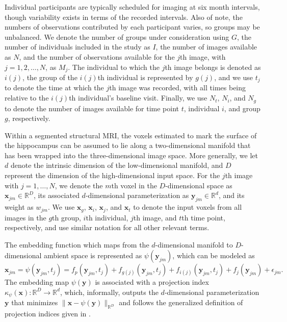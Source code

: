 \documentclass[11pt,reqno]{article}
\theoremstyle{definition}
\begin{document}
Individual participants are typically scheduled for imaging at six month intervals, though variability exists in terms of the recorded intervals. Also of note, the numbers of observations contributed by each participant varies, so groups may be unbalanced. We denote the number of groups under consideration using $G$, the number of individuals included in the study as $I$, the number of images available as $N$, and the number of observations available for the $j$th image, with $j = 1, 2, \dots, N$, as $M_j$. The individual to which the $j$th image belongs is denoted as $i(j)$, the group of the $i(j)$th individual is represented by $g(j)$, and we use $t_j$ to denote the time at which the $j$th image was recorded, with all times being relative to the $i(j)$th individual's baseline visit. Finally, we use $N_t$, $N_i$, and $N_g$ to denote the number of images available for time point $t$, individual $i$, and group $g$, respectively.

Within a segmented structural MRI, the voxels estimated to mark the surface of the hippocampus can be assumed to lie along a two-dimensional manifold that has been wrapped into the three-dimensional image space. More generally, we let $d$ denote the intrinsic dimension of the low-dimensional manifold, and $D$ represent the dimension of the high-dimensional input space. For the $j$th image with $j = 1, \dots, N$, we denote the $m$th voxel in the $D$-dimensional space as $\mathbf{x}_{jm} \in \mathbb{R}^{D}$, its associated $d$-dimensional parameterization as $\mathbf{y}_{jm} \in \mathbb{R}^{d}$, and its weight as $w_{jm}$. We use $\mathbf{x}_g$, $\mathbf{x}_i$, $\mathbf{x}_{j}$, and $\mathbf{x}_t$ to denote the input voxels from all images in the $g$th group, $i$th individual, $j$th image, and $t$th time point, respectively, and use similar notation for all other relevant terms.

The embedding function which maps from the $d$-dimensional manifold to $D$-dimensional ambient space is represented as $\psi(\mathbf{y}_{jm})$, which can be modeled as 
\begin{equation}
  \mathbf{x}_{jm} = \psi(\mathbf{y}_{jm}, t_j) = f_p(\mathbf{y}_{jm}, t_{j}) + f_{g(j)}(\mathbf{y}_{jm}, t_{j}) + f_{i(j)}(\mathbf{y}_{jm}, t_{j}) + f_j(\mathbf{y}_{jm}) + \epsilon_{jm}. \label{eq:2}
\end{equation}
The embedding map $\psi(\mathbf{y})$ is associated with a projection index $\kappa_{\psi}(\mathbf{x}): \mathbb{R}^{D} \to \mathbb{R}^{d}$, which, informally, outputs the $d$-dimensional parameterization $\mathbf{y}$ that minimizes $\|\mathbf{x} - \psi(\mathbf{y})\|_{\mathbb{R}^{D}}$ and follows the generalized definition of projection indices given in \cite{mengPrincipalManifoldEstimation2021}.
\end{document}
